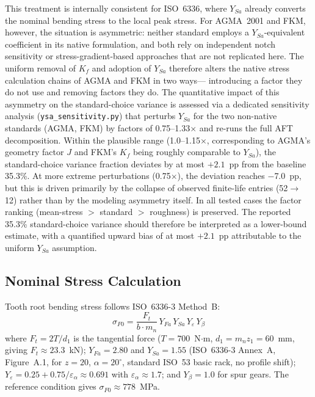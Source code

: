 \documentclass[12pt,a4paper]{article}
\begin{document}
This treatment is internally consistent for ISO~6336, where $Y_{Sa}$
already converts the nominal bending stress to the local peak stress.
For AGMA~2001 and FKM, however, the situation is asymmetric: neither
standard employs a $Y_{Sa}$-equivalent coefficient in its native
formulation, and both rely on independent notch sensitivity or
stress-gradient-based approaches that are not replicated here. The
uniform removal of $K_f$ and adoption of $Y_{Sa}$ therefore alters the
native stress calculation chains of AGMA and FKM in two ways---%
introducing a factor they do not use and removing factors they do.
The quantitative impact of this asymmetry on the standard-choice
variance is assessed via a dedicated sensitivity analysis
(\texttt{ysa\_sensitivity.py}) that perturbs $Y_{Sa}$ for the two
non-native standards (AGMA, FKM) by factors of 0.75--1.33$\times$ and
re-runs the full AFT decomposition. Within the plausible range
(1.0--1.15$\times$, corresponding to AGMA's geometry factor $J$ and
FKM's $K_f$ being roughly comparable to $Y_{Sa}$), the standard-choice
variance fraction deviates by at most $+2.1$~pp from the baseline
35.3\%. At more extreme perturbations (0.75$\times$), the deviation
reaches $-$7.0~pp, but this is driven primarily by the collapse of
observed finite-life entries (52$\rightarrow$12) rather than by the
modeling asymmetry itself. In all tested cases the factor ranking
(mean-stress $>$ standard $>$ roughness) is preserved. The reported
35.3\% standard-choice variance should therefore be interpreted as a
lower-bound estimate, with a quantified upward bias of at most
$+2.1$~pp attributable to the uniform $Y_{Sa}$ assumption.

\subsection{Nominal Stress Calculation}

Tooth root bending stress follows ISO~6336-3 Method~B:
\begin{equation}
\label{eq:sigma_F0}
\sigma_{F0} = \frac{F_t}{b \cdot m_n} \,
Y_{Fa} \, Y_{Sa} \, Y_\varepsilon \, Y_\beta
\end{equation}
where $F_t = 2T/d_1$ is the tangential force ($T=700$~N$\cdot$m,
$d_1 = m_n z_1 = 60$~mm, giving $F_t \approx 23.3$~kN);
$Y_{Fa}=2.80$ and $Y_{Sa}=1.55$ (ISO~6336-3 Annex~A, Figure~A.1,
for $z=20$, $\alpha=20^\circ$, standard ISO~53 basic rack, no profile
shift); $Y_\varepsilon = 0.25 + 0.75/\varepsilon_\alpha \approx 0.691$
with $\varepsilon_\alpha \approx 1.7$; and $Y_\beta = 1.0$ for spur
gears. The reference condition gives $\sigma_{F0} \approx 778$~MPa.
\end{document}
